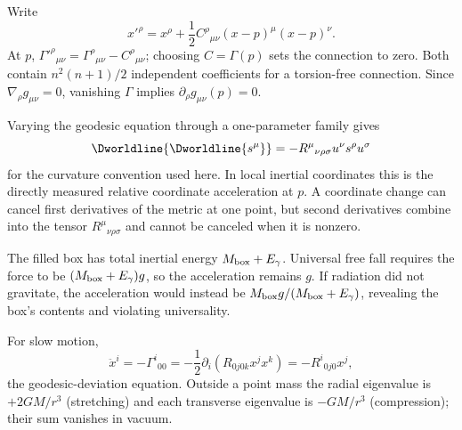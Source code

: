 \begin{solutions}
\begin{solution}
Write
\[
x'^\rho=x^\rho+\frac12C^\rho{}_{\mu\nu}
(x-p)^\mu(x-p)^\nu .
\]
At \(p\),
\(\Gamma'^\rho{}_{\mu\nu}=\Gamma^\rho{}_{\mu\nu}-C^\rho{}_{\mu\nu}\);
choosing \(C=\Gamma(p)\) sets the connection to zero.  Both contain
\(n^2(n+1)/2\) independent coefficients for a torsion-free connection.  Since
\(\nabla_\rho g_{\mu\nu}=0\), vanishing \(\Gamma\) implies
\(\partial_\rho g_{\mu\nu}(p)=0\).
\end{solution}

\begin{solution}
Varying the geodesic equation through a one-parameter family gives
\[
\Dworldline{\Dworldline{s^\mu}}
=-R^\mu{}_{\nu\rho\sigma}u^\nu s^\rho u^\sigma
\]
for the curvature convention used here.  In local inertial coordinates this
is the directly measured relative coordinate acceleration at \(p\).  A
coordinate change can cancel first derivatives of the metric at one point,
but second derivatives combine into the tensor \(R^\mu{}_{\nu\rho\sigma}\)
and cannot be canceled when it is nonzero.
\end{solution}

\begin{solution}
The filled box has total inertial energy \(M_{\rm box}+E_\gamma\).  Universal
free fall requires the force to be
\((M_{\rm box}+E_\gamma)g\), so the acceleration remains \(g\).  If radiation
did not gravitate, the acceleration would instead be
\(M_{\rm box}g/(M_{\rm box}+E_\gamma)\), revealing the box's contents and
violating universality.
\end{solution}

\begin{solution}
For slow motion,
\[
\ddot x^i=-\Gamma^i{}_{00}
=-\frac12\partial_i(R_{0j0k}x^jx^k)
=-R^i{}_{0j0}x^j,
\]
the geodesic-deviation equation.  Outside a point mass the radial eigenvalue
is \(+2GM/r^3\) (stretching) and each transverse eigenvalue is
\(-GM/r^3\) (compression); their sum vanishes in vacuum.
\end{solution}



\end{solutions}
